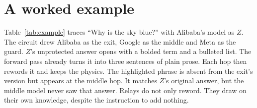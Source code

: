 \documentclass[11pt]{article}
\begin{document}
\section{A worked example}

Table~\ref{tab:example} traces ``Why is the sky blue?'' with Alibaba's model as $Z$. The circuit drew Alibaba as the exit, Google as the middle and Meta as the guard. $Z$'s unprotected answer opens with a bolded term and a bulleted list. The forward pass already turns it into three sentences of plain prose. Each hop then rewords it and keeps the physics. The highlighted phrase is absent from the exit's version but appears at the middle hop. It matches $Z$'s original answer, but the middle model never saw that answer. Relays do not only reword. They draw on their own knowledge, despite the instruction to add nothing.
\end{document}
